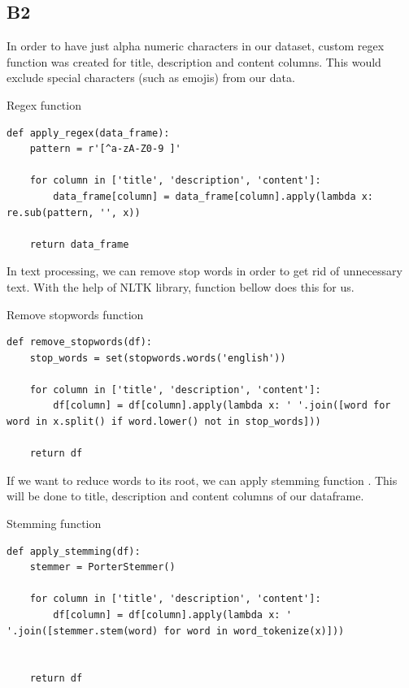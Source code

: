 \subsection{B2}\label{B2}

In order to have just alpha numeric characters in our dataset, custom regex function was created for title, description and content columns. This would exclude special characters (such as emojis) from our data.
\begin{listing}[H]
\caption{Regex function}
\begin{verbatim}
def apply_regex(data_frame):
    pattern = r'[^a-zA-Z0-9 ]'

    for column in ['title', 'description', 'content']:
        data_frame[column] = data_frame[column].apply(lambda x: re.sub(pattern, '', x))

    return data_frame
\end{verbatim}
\end{listing}

In text processing, we can remove stop words \parencite{vijayarani2015preprocessing} in order to get rid of unnecessary text. With the help of NLTK \parencite{web:Nltk} library, function bellow does this for us.
\begin{listing}[H]
\caption{Remove stopwords function}
\begin{verbatim}
def remove_stopwords(df):
    stop_words = set(stopwords.words('english'))

    for column in ['title', 'description', 'content']:
        df[column] = df[column].apply(lambda x: ' '.join([word for word in x.split() if word.lower() not in stop_words]))

    return df
\end{verbatim}
\end{listing}

If we want to reduce words to its root, we can apply stemming function \parencite{jivani2011comparative}. This will be done to title, description and content columns of our dataframe.
\begin{listing}[H]
\caption{Stemming function}
\begin{verbatim}
def apply_stemming(df):
    stemmer = PorterStemmer()

    for column in ['title', 'description', 'content']:
        df[column] = df[column].apply(lambda x: ' '.join([stemmer.stem(word) for word in word_tokenize(x)]))


    return df
\end{verbatim}
\end{listing}

